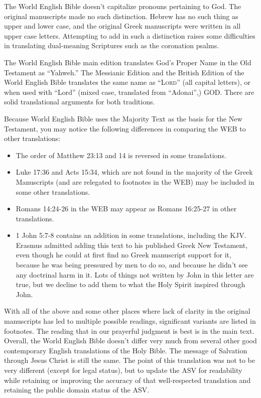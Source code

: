 The World English Bible doesn't capitalize pronouns pertaining to God.
The original manuscripts made no such distinction. Hebrew has no such
thing as upper and lower case, and the original Greek manuscripts were
written in all upper case letters. Attempting to add in such a
distinction raises some difficulties in translating dual-meaning
Scriptures such as the coronation psalms.

The World English Bible main edition translates God's Proper Name in the
Old Testament as ``Yahweh.'' The Messianic Edition and the British
Edition of the World English Bible translates the same name as
``\textsc{Lord}'' (all capital letters), or when used with ``Lord''
(mixed case, translated from ``Adonai'',) GOD. There are solid
translational arguments for both traditions.

Because World English Bible uses the Majority Text as the basis for the
New Testament, you may notice the following differences in comparing the
WEB to other translations:

\begin{itemize}
\tightlist
\item
  The order of Matthew 23:13 and 14 is reversed in some translations.
\item
  Luke 17:36 and Acts 15:34, which are not found in the majority of the
  Greek Manuscripts (and are relegated to footnotes in the WEB) may be
  included in some other translations.
\item
  Romans 14:24-26 in the WEB may appear as Romans 16:25-27 in other
  translations.
\item
  1 John 5:7-8 contains an addition in some translations, including the
  KJV. Erasmus admitted adding this text to his published Greek New
  Testament, even though he could at first find no Greek manuscript
  support for it, because he was being pressured by men to do so, and
  because he didn't see any doctrinal harm in it. Lots of things not
  written by John in this letter are true, but we decline to add them to
  what the Holy Spirit inspired through John.
\end{itemize}

With all of the above and some other places where lack of clarity in the
original manuscripts has led to multiple possible readings, significant
variants are listed in footnotes. The reading that in our prayerful
judgment is best is in the main text. Overall, the World English Bible
doesn't differ very much from several other good contemporary English
translations of the Holy Bible. The message of Salvation through Jesus
Christ is still the same. The point of this translation was not to be
very different (except for legal status), but to update the ASV for
readability while retaining or improving the accuracy of that
well-respected translation and retaining the public domain status of the
ASV.

